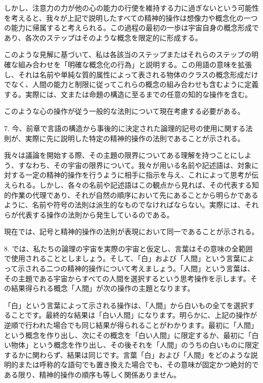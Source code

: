\documentclass[a4paper,11pt,openany]{ltjsbook}
\begin{document}
しかし、注意力の力が他の心の能力の行使を維持する力に過ぎないという可能性を考えると、我々が上記で説明したすべての精神的操作は想像力や概念化の一つの能力に帰属すると考えられる。この過程の最初の一歩は宇宙自身の概念形成であり、各次のステップはそのような概念を限定的に形成する。

このような見解に基づいて、私は各該当のステップまたはそれらのステップの明確な組み合わせを「明確な概念化の行為」と説明する。この用語の意味を拡張し、それは名前や単純な質的属性によって表される物体のクラスの概念形成だけでなく、人間の能力と制限に従ってこれらの概念の組み合わせも含むように定義する。実際には、文または命題の構造に至るまでの任意の知的な操作を含む。

このような心の操作が従う一般的な法則について現在考慮する必要がある。

7. 今、前章で言語の構造から事後的に決定された論理的記号の使用に関する法則が、実際に先に説明した特定の精神的操作の法則であることが示される。

我々は議論を開始する際、その主題の限界についてある理解を持つことにしよう、すなわち、その宇宙の限界について。我々が用いる名前や記述語は、対象に対する一定の精神的操作を行うように相手に指示を与え、これによって思考が伝えられる。しかし、各々の名前や記述語はこの観点から見れば、その代表する知的作業の代理であり、それが自然の順序において先にあることから明らかであるように、名前や符号の法則は派生的なものでなければならない。実際には、それらが代表する操作の法則から発生しているのである。

現在では、記号と精神的操作の法則が表現において同一であることが示される。

8. では、私たちの論理の宇宙を実際の宇宙と仮定し、言葉はその意味の全範囲で使用されることとしましょう。そして、「白」および「人間」という言葉によって示される二つの精神的操作について考えましょう。「人間」という言葉は、その主題である宇宙からすべての人間を選択するという思考操作を示します。その結果得られる概念「人間」が次の操作の主題となります。

「白」という言葉によって示される操作は、「人間」から白いもの全てを選択することです。最終的な結果は「白い人間」になります。明らかに、上記の操作が逆順で行われた場合でも同じ結果が得られることがわかります。最初に「人間」という概念を作り出し、次にその概念を「白い人間」に限定するか、最初に「白い物体」という概念を作り出し、その後それを「人間」のうちの白いものに限定するかに関わらず、結果は同じです。言葉「白」および「人間」をどのような説明的または呼称的な語句でも置き換えた場合でも、その意味が固定かつ絶対的である限り、精神的操作の順序も等しく関係ありません。
\end{document}
